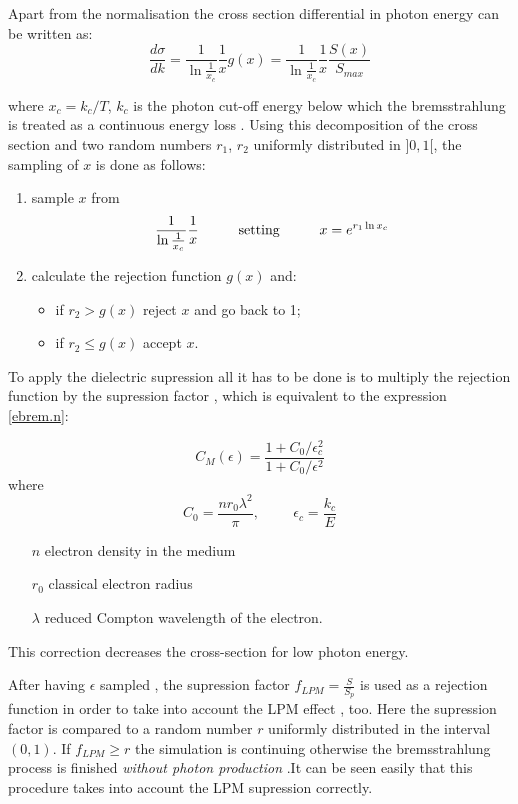 Apart from the normalisation the cross section differential in photon
energy can be written as:
\[
\frac{d \sigma}{d k} = \frac{1}{\ln \frac{1}{x_{c}}} \frac{1}{x}
g(x) = \frac{1}{\ln \frac{1}{x_{c}}} \frac{1}{x} \frac{S(x)}{S_{max}}
\]

where $x_{c} = k_{c}/T$, $k_{c}$ is the photon cut-off energy below
which the bremsstrahlung is treated as a continuous energy loss
. Using this decomposition of
the cross section and two random numbers $r_{1}$, $r_{2}$ uniformly
distributed in $]0,1[$, the sampling of $x$ is done as follows:
\begin{enumerate}
\item sample $x$ from
\[
\frac{1}{\ln \frac{1}{x_{c}}} \frac{1}{x} \mbox{\hspace{1cm}setting\hspace{1cm}}
x = e^{r_{1} \ln x_{c}}
\]

\item calculate the rejection function $g(x)$ and:
\begin{itemize}
\item if $r_{2} > g(x)$ reject $x$ and go back to 1;
\item if $r_{2} \leq g(x)$ accept $x$.
\end{itemize}
\end{enumerate}

To apply the dielectric supression  \cite{ebrem.migdal}
  all it has to be done is to
multiply the rejection function by the supression factor , which is 
equivalent to the expression \ref{ebrem.n}:

\[
C_M (\epsilon)  =\frac{1 + C_0 / \epsilon_c^2}
               {1 + C_0 / \epsilon^2}
\]
 where
\[
C_0 =\frac{nr_0 \lambda^2 }{\pi}, \hspace{1cm} \epsilon_c = \frac{k_{c}}{E}
\]
\begin{itemize}
\item[$n$]           electron density in the medium
\item[$r_0$]         classical electron radius
\item[$\lambda$]    reduced Compton wavelength of the electron.
\end{itemize}
This correction decreases the cross-section for low photon energy.

 After having $\epsilon$ sampled , the supression factor $f_{LPM}=\frac{S}{S_p}$ is
used as a rejection function in order to take into account the LPM effect , too.
Here the supression factor is compared to a random number $r$ uniformly
distributed in the interval $(0,1)$. If  $f_{LPM} \geq r$ the simulation
is continuing otherwise the bremsstrahlung process is finished 
{\em without photon production } .It can be seen easily that this procedure
takes into account the LPM supression correctly.


